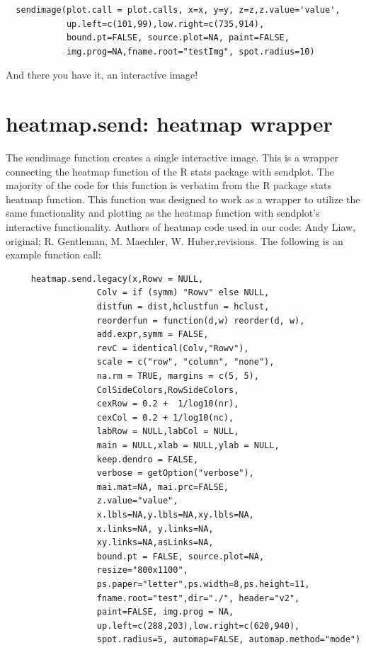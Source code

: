\documentclass[]{article}
\begin{document}
\begin{verbatim}
  sendimage(plot.call = plot.calls, x=x, y=y, z=z,z.value='value',
            up.left=c(101,99),low.right=c(735,914),
            bound.pt=FALSE, source.plot=NA, paint=FALSE,
            img.prog=NA,fname.root="testImg", spot.radius=10)

\end{verbatim}

And there you have it, an interactive image! 

\newpage

\section{heatmap.send: heatmap wrapper}


The sendimage function creates a single interactive image. This is a wrapper connecting the heatmap function of the R stats package with sendplot. The majority of the code for this function is verbatim from the R package stats heatmap function. This function was designed to work as a wrapper to utilize the same functionality and plotting as the heatmap function with sendplot's interactive functionality. Authors of heatmap code used in our code: Andy Liaw, original; R. Gentleman, M. Maechler, W. Huber,revisions. The following is an example function call: 

\begin{verbatim}
     heatmap.send.legacy(x,Rowv = NULL,
                  Colv = if (symm) "Rowv" else NULL, 
                  distfun = dist,hclustfun = hclust,
                  reorderfun = function(d,w) reorder(d, w),
                  add.expr,symm = FALSE,
                  revC = identical(Colv,"Rowv"),
                  scale = c("row", "column", "none"),
                  na.rm = TRUE, margins = c(5, 5),
                  ColSideColors,RowSideColors,
                  cexRow = 0.2 +  1/log10(nr),
                  cexCol = 0.2 + 1/log10(nc),
                  labRow = NULL,labCol = NULL,
                  main = NULL,xlab = NULL,ylab = NULL,
                  keep.dendro = FALSE, 
                  verbose = getOption("verbose"),
                  mai.mat=NA, mai.prc=FALSE,
                  z.value="value",
                  x.lbls=NA,y.lbls=NA,xy.lbls=NA,
                  x.links=NA, y.links=NA,
                  xy.links=NA,asLinks=NA,
                  bound.pt = FALSE, source.plot=NA,
                  resize="800x1100",
                  ps.paper="letter",ps.width=8,ps.height=11,
                  fname.root="test",dir="./", header="v2",
                  paint=FALSE, img.prog = NA,
                  up.left=c(288,203),low.right=c(620,940),
                  spot.radius=5, automap=FALSE, automap.method="mode") 
\end{verbatim}
\end{document}
